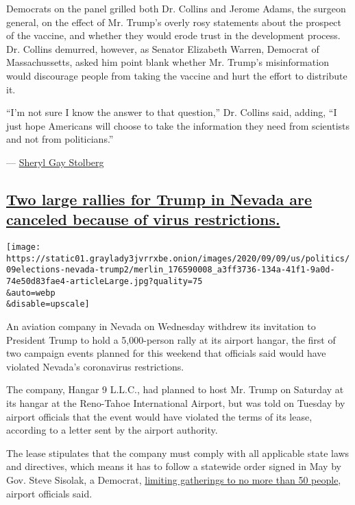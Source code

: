 Democrats on the panel grilled both Dr. Collins and Jerome Adams, the
surgeon general, on the effect of Mr. Trump's overly rosy statements
about the prospect of the vaccine, and whether they would erode trust in
the development process. Dr. Collins demurred, however, as Senator
Elizabeth Warren, Democrat of Massachussetts, asked him point blank
whether Mr. Trump's misinformation would discourage people from taking
the vaccine and hurt the effort to distribute it.

``I'm not sure I know the answer to that question,'' Dr. Collins said,
adding, ``I just hope Americans will choose to take the information they
need from scientists and not from politicians.''

---
\href{https://www.nytimes3xbfgragh.onion/by/sheryl-gay-stolberg}{Sheryl
Gay Stolberg}

\hypertarget{two-large-rallies-for-trump-in-nevada-are-canceled-because-of-virus-restrictions}{%
\subsection{\texorpdfstring{\protect\hyperlink{two-large-rallies-for-trump-in-nevada-are-canceled-because-of-virus-restrictions}{Two
large rallies for Trump in Nevada are canceled because of virus
restrictions.}}{Two large rallies for Trump in Nevada are canceled because of virus restrictions.}}\label{two-large-rallies-for-trump-in-nevada-are-canceled-because-of-virus-restrictions}}

\texttt{[image: https://static01.graylady3jvrrxbe.onion/images/2020/09/09/us/politics/09elections-nevada-trump2/merlin\_176590008\_a3ff3736-134a-41f1-9a0d-74e50d83fae4-articleLarge.jpg?quality=75\\\&auto=webp\\\&disable=upscale]}

An aviation company in Nevada on Wednesday withdrew its invitation to
President Trump to hold a 5,000-person rally at its airport hangar, the
first of two campaign events planned for this weekend that officials
said would have violated Nevada's coronavirus restrictions.

The company, Hangar 9 L.L.C., had planned to host Mr. Trump on Saturday
at its hangar at the Reno-Tahoe International Airport, but was told on
Tuesday by airport officials that the event would have violated the
terms of its lease, according to a letter sent by the airport authority.

The lease stipulates that the company must comply with all applicable
state laws and directives, which means it has to follow a statewide
order signed in May by Gov. Steve Sisolak, a Democrat,
\href{http://gov.nv.gov/News/Press/2020/Governor_Sisolak_Releases_Prepared_Remarks,_Guidance_for_Phase_2_Reopening,_Plans_Press_Call/}{limiting
gatherings to no more than 50 people}, airport officials said.

